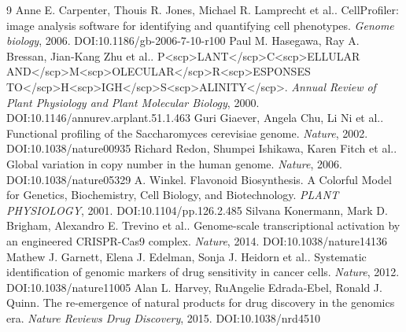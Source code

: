 \documentclass[11pt]{article}
\begin{document}
\begin{thebibliography}{9}
 Anne E. Carpenter, Thouis R. Jones, Michael R. Lamprecht et al.. CellProfiler: image analysis software for identifying and quantifying cell phenotypes. \emph{Genome biology}, 2006. DOI:10.1186/gb-2006-7-10-r100
 Paul M. Hasegawa, Ray A. Bressan, Jian‐Kang Zhu et al.. P<scp>LANT</scp>C<scp>ELLULAR AND</scp>M<scp>OLECULAR</scp>R<scp>ESPONSES TO</scp>H<scp>IGH</scp>S<scp>ALINITY</scp>. \emph{Annual Review of Plant Physiology and Plant Molecular Biology}, 2000. DOI:10.1146/annurev.arplant.51.1.463
 Guri Giaever, Angela Chu, Li Ni et al.. Functional profiling of the Saccharomyces cerevisiae genome. \emph{Nature}, 2002. DOI:10.1038/nature00935
 Richard Redon, Shumpei Ishikawa, Karen Fitch et al.. Global variation in copy number in the human genome. \emph{Nature}, 2006. DOI:10.1038/nature05329
 A. Winkel. Flavonoid Biosynthesis. A Colorful Model for Genetics, Biochemistry, Cell Biology, and Biotechnology. \emph{PLANT PHYSIOLOGY}, 2001. DOI:10.1104/pp.126.2.485
 Silvana Konermann, Mark D. Brigham, Alexandro E. Trevino et al.. Genome-scale transcriptional activation by an engineered CRISPR-Cas9 complex. \emph{Nature}, 2014. DOI:10.1038/nature14136
 Mathew J. Garnett, Elena J. Edelman, Sonja J. Heidorn et al.. Systematic identification of genomic markers of drug sensitivity in cancer cells. \emph{Nature}, 2012. DOI:10.1038/nature11005
 Alan L. Harvey, RuAngelie Edrada‐Ebel, Ronald J. Quinn. The re-emergence of natural products for drug discovery in the genomics era. \emph{Nature Reviews Drug Discovery}, 2015. DOI:10.1038/nrd4510
\end{thebibliography}
\end{document}
